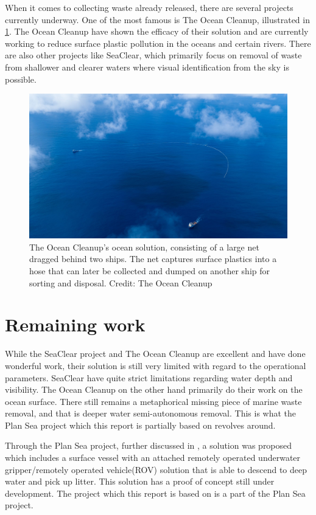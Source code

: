 \documentclass[class=article, crop=false]{standalone}
\begin{document}
When it comes to collecting waste already released, there are several projects currently underway. One of the most famous is The Ocean Cleanup, illustrated in \cref{fig:oceancleanup}. The Ocean Cleanup have shown the efficacy of their solution and are currently working to reduce surface plastic pollution in the oceans and certain rivers. There are also other projects like SeaClear, which primarily focus on removal of waste from shallower and clearer waters where visual identification from the sky is possible.

\begin{figure}
	\centering
	\includegraphics{TheOceanCleanup}
	\caption{The Ocean Cleanup's ocean solution, consisting of a large net dragged behind two ships. The net captures surface plastics into a hose that can later be collected and dumped on another ship for sorting and disposal. Credit: The Ocean Cleanup}
	\label{fig:oceancleanup}
\end{figure}

\section{Remaining work}
While the SeaClear project and The Ocean Cleanup are excellent and have done wonderful work, their solution is still very limited with regard to the operational parameters. SeaClear have quite strict limitations regarding water depth and visibility. The Ocean Cleanup on the other hand primarily do their work on the ocean surface. There still remains a metaphorical missing piece of marine waste removal, and that is deeper water semi-autonomous removal. This is what the Plan Sea project which this report is partially based on revolves around.

Through the Plan Sea project, further discussed in \citet{specialization}, a solution was proposed which includes a surface vessel with an attached remotely operated underwater gripper/remotely operated vehicle(ROV) solution that is able to descend to deep water and pick up litter. This solution has a proof of concept still under development. The project which this report is based on is a part of the Plan Sea project.
\end{document}
